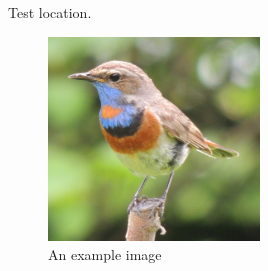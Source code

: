 \documentclass{article}
\begin{document}
\lipsum[1-4] %

Test location.
\begin{figure}[ht]
  \centering
  \includegraphics[width=0.5\textwidth]{example-image-a.jpg}
  \caption{An example image}
\end{figure}

\lipsum[6-10] %
\end{document}
